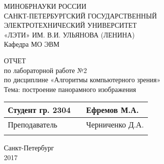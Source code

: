 \clearpage
\begin{center}	
	МИНОБРНАУКИ РОССИИ\\
	САНКТ-ПЕТЕРБУРГСКИЙ ГОСУДАРСТВЕННЫЙ\\
	ЭЛЕКТРОТЕХНИЧЕСКИЙ УНИВЕРСИТЕТ\\
	«ЛЭТИ» ИМ. В.И. УЛЬЯНОВА (ЛЕНИНА)\\
	Кафедра МО ЭВМ

	\vspace{54mm}

	ОТЧЕТ\\
	по лабораторной работе №2 \\
	по дисциплине «Алгоритмы компьютерного зрения» \\
	Тема: построение панорамного изображения \\

	\vspace{65mm}

	\def\arraystretch{1.5}
	\begin{tabularx}{\textwidth}{ >{\hsize=7cm}X >{\hsize=4.1cm}X  >{\centering\arraybackslash}X }
		Студент гр. 2304 & & Ефремов М.А. \\ \cline{2-2}
		Преподаватель & & Черниченко Д.А. \\ \cline{2-2}
	\end{tabularx}
	\def\arraystretch{1}

	\vfill
	Санкт-Петербург\\
	2017
\end{center}
\newpage
{}
\setcounter{page}{1}